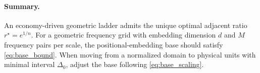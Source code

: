 \documentclass{article}
\theoremstyle{plain}
\theoremstyle{definition}
\theoremstyle{remark}
\begin{document}
\paragraph{Summary.}
An economy-driven geometric ladder admits the unique optimal adjacent ratio $r^\star=e^{1/n}$. For a geometric frequency grid with embedding dimension $d$ and $M$ frequency pairs per scale, the positional-embedding base should satisfy \eqref{eq:base_bound}. When moving from a normalized domain to physical units with minimal interval $\Delta_0$, adjust the base following \eqref{eq:base_scaling}.
\end{document}
